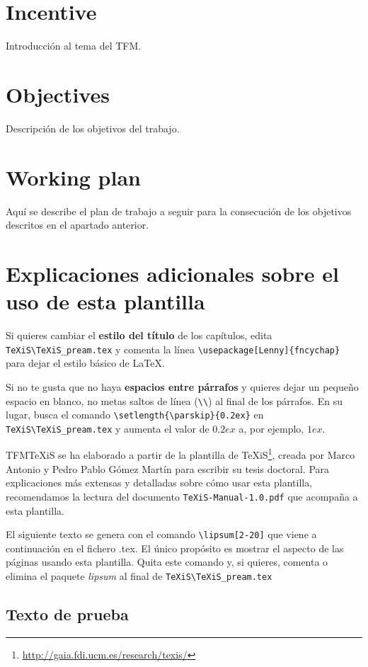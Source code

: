\section{Incentive}
Introducción al tema del TFM.


\section{Objectives}
Descripción de los objetivos del trabajo.


\section{Working plan}
Aquí se describe el plan de trabajo a seguir para la consecución de los objetivos descritos en el apartado anterior.



\section{Explicaciones adicionales sobre el uso de esta plantilla}
Si quieres cambiar el \textbf{estilo del título} de los capítulos, edita \verb|TeXiS\TeXiS_pream.tex| y comenta la línea \verb|\usepackage[Lenny]{fncychap}| para dejar el estilo básico de \LaTeX.

Si no te gusta que no haya \textbf{espacios entre párrafos} y quieres dejar un pequeño espacio en blanco, no metas saltos de línea (\verb|\\|) al final de los párrafos. En su lugar, busca el comando  \verb|\setlength{\parskip}{0.2ex}| en \verb|TeXiS\TeXiS_pream.tex| y aumenta el valor de $0.2ex$ a, por ejemplo, $1ex$.

TFMTeXiS se ha elaborado a partir de la plantilla de TeXiS\footnote{\url{http://gaia.fdi.ucm.es/research/texis/}}, creada por Marco Antonio y Pedro Pablo Gómez Martín para escribir su tesis doctoral. Para explicaciones más extensas y detalladas sobre cómo usar esta plantilla, recomendamos la lectura del documento \texttt{TeXiS-Manual-1.0.pdf} que acompaña a esta plantilla.

El siguiente texto se genera con el comando \verb|\lipsum[2-20]| que viene a continuación en el fichero .tex. El único propósito es mostrar el aspecto de las páginas usando esta plantilla. Quita este comando y, si quieres, comenta o elimina el paquete \textit{lipsum} al final de \verb|TeXiS\TeXiS_pream.tex|

\subsection{Texto de prueba}


